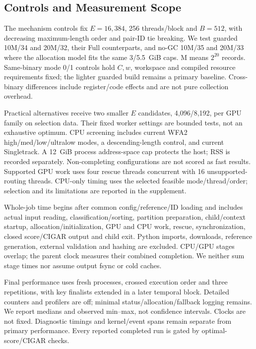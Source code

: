 \documentclass[conference,a4paper]{IEEEtran}
\begin{document}
\subsection{Controls and Measurement Scope}
The mechanism controls fix $E=16,384 $, 256 threads/block and $B=512$, with decreasing maximum-length order and pair-ID tie breaking. We test guarded 10M/34 and 20M/32, their Full counterparts, and no-GC 10M/35 and 20M/33 where the allocation model fits the same 3/5.5~GiB caps. M means $2^{20}$ records. Same-binary mode 0/1 controls hold $C,w$, workspace and compiled resource requirements fixed; the lighter guarded build remains a primary baseline. Cross-binary differences include register/code effects and are not pure collection overhead.

Practical alternatives receive two smaller $E$ candidates, 4,096/8,192, per GPU family on selection data. Their fixed worker settings are bounded tests, not an exhaustive optimum. CPU screening includes current WFA2 high/med/low/ultralow modes, a descending-length control, and current Singletrack. A 12~GiB process address-space cap protects the host; RSS is recorded separately. Non-completing configurations are not scored as fast results. Supported GPU work uses four rescue threads concurrent with 16 unsupported-routing threads. CPU-only timing uses the selected feasible mode/thread/order; selection and its limitations are reported in the supplement.

Whole-job time begins after common config/reference/ID loading and includes actual input reading, classification/sorting, partition preparation, child/context startup, allocation/initialization, GPU and CPU work, rescue, synchronization, closed score/CIGAR output and child exit. Python imports, downloads, reference generation, external validation and hashing are excluded. CPU/GPU stages overlap; the parent clock measures their combined completion. We neither sum stage times nor assume output fsync or cold caches.

Final performance uses fresh processes, crossed execution order and three repetitions, with key finalists extended in a later temporal block. Detailed counters and profilers are off; minimal status/allocation/fallback logging remains. We report medians and observed min--max, not confidence intervals. Clocks are not fixed. Diagnostic timings and kernel/event spans remain separate from primary performance. Every reported completed run is gated by optimal-score/CIGAR checks.
\end{document}
